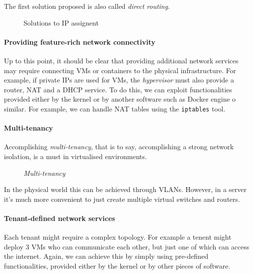\begin{note}
    The first solution proposed is also called \emph{direct routing}.
\end{note}

\newpage
\begin{figure}[ht!]
    \centering
    \hspace{2cm}
    \caption{Solutions to IP assignent}
\end{figure}

\paragraph{Providing feature-rich network connectivity}
Up to this point, it should be clear that providing additional network services
may require connecting VMs or containers to the physical infrastructure. For
example, if private IPs are used for VMs, the \emph{hypervisor} must also provide
a router, NAT and a DHCP service. To do this, we can exploit functionalities
provided either by the kernel or by another software such as Docker engine o
similar. For example, we can handle NAT tables using the \texttt{iptables} tool.

\paragraph{Multi-tenancy}
Accomplishing \emph{multi-tenancy}, that is to say, accomplishing a strong network
isolation, is a must in virtualised environments.

\begin{figure}[h!]
    \centering
    \caption{\emph{Multi-tenancy}}
\end{figure}

\noindent
In the physical world this can be achieved through VLANs. However, in a server
it's much more convenient to just create multiple virtual switches and
routers.

\paragraph{Tenant-defined network services}
Each tenant might require a complex topology. For example a tenent might deploy
3 VMs who can communicate each other, but just one of which can access the
internet. Again, we can achieve this by simply using pre-defined functionalities,
provided either by the kernel or by other pieces of software.

